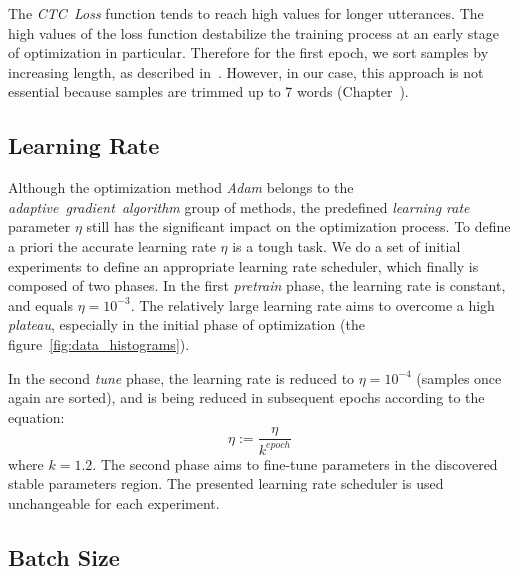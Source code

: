 The \textit{CTC~Loss} function tends to reach high values for longer utterances.
The high values of the loss function destabilize the training process at an early stage of optimization in particular.
Therefore for the first epoch, we sort samples by increasing length, as described in~\cite{amodei2015}.
However, in our case, this approach is not essential because samples are trimmed
up to 7 words (Chapter~).


\subsection*{Learning Rate}

Although the optimization method \textit{Adam} belongs to the \textit{adaptive~gradient~algorithm} group of methods,
the predefined \textit{learning rate} parameter $\eta$ still has the significant impact on the optimization process.
To define a priori the accurate learning rate $\eta$ is a tough task.
We do a set of initial experiments to define an appropriate learning rate scheduler, which
finally is composed of two phases.
In the first \textit{pretrain} phase, the learning rate is constant, and equals $\eta=10^{-3}$.
The relatively large learning rate aims to overcome a high \textit{plateau},
especially in the initial phase of optimization (the figure~\ref{fig:data_histograms}).

In the second \textit{tune} phase, the learning rate is reduced to $\eta=10^{-4}$
(samples once again are sorted), and is being reduced in subsequent epochs according to the equation:
\begin{equation} \label{eq:lr_scheduler}
\eta := \frac{\eta}{k^{epoch}}
\end{equation}
where $k=1.2$.
The second phase aims to fine-tune parameters in the discovered stable parameters region.
The presented learning rate scheduler is used unchangeable for each experiment.


\subsection*{Batch Size}

